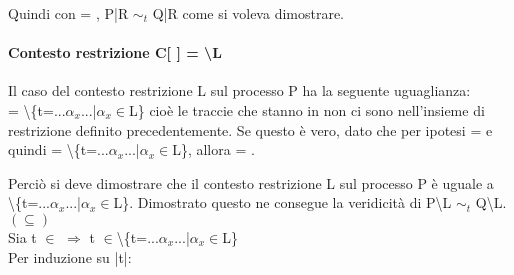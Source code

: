 
Quindi con  = , P|R $\sim_{t}$ Q|R come si voleva dimostrare.

\paragraph{Contesto restrizione  C[ ] = \textbackslash L} \mbox{}

Il caso del contesto restrizione L sul processo P ha la seguente uguaglianza:\\  = \textbackslash\{t=...$\alpha_{x}$...|$\alpha_{x}\in$L\} cioè le traccie che stanno in  non ci sono nell'insieme di restrizione definito precedentemente. Se questo è vero, dato che per ipotesi  =  e quindi  = \textbackslash \{t=...$\alpha_{x}$...|$\alpha_{x}\in$L\}, allora  = . 

Perciò si deve dimostrare che il contesto restrizione L sul processo P è uguale a \\
\textbackslash \{t=...$\alpha_{x}$...|$\alpha_{x}\in$L\}. Dimostrato questo ne consegue la veridicità di P\textbackslash L $\sim_{t}$ Q\textbackslash L.\\

$(\subseteq)$ \\

Sia t $\in$  $\Rightarrow$  t $\in$\textbackslash\{t=...$\alpha_{x}$...|$\alpha_{x}\in$L\}\\
Per induzione su |t|:
\\

